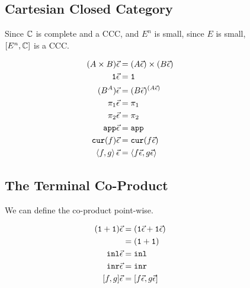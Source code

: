 \documentclass{Report}
\begin{document}
\begin{figure}
    \label{HowToBuildCCC}
    \begin{framed}
        \subsection{Cartesian Closed Category}
Since $\C$ is complete  and a CCC, and $E^n$ is small, since $E$ is small, $[E^n, \C]$ is a CCC.

\begin{align}
    (A\times B)\ev & = (A\ev)\times(B\ev)\\
    \1\ev & = \1\\
    (B^A)\ev &= (B\ev)^{(A\ev)}\\
    \p\ev & = \p\\
    \pp\ev & = \pp\\
    \app\ev & = \app\\
    \cur{f}\ev & = \cur{f\ev}\\
    \pr{f}{g}\ev & = \pr{f\ev}{g\ev}\\
\end{align}

\end{framed}
\end{figure}

\begin{figure}
    \label{HowToBuildCoproduct}
\begin{framed}
    \subsection{The Terminal Co-Product}

We can define the co-product point-wise.

\begin{align}
    (\1 + \1)\ev & = (\1\ev + \1\ev)\\
    & = (\1 + \1)\\
    \inl\ev &= \inl\\
    \inr\ev &= \inr\\
    [f, g]\ev &= [f\ev, g\ev]\\
\end{align}
\end{framed}
\end{figure}
\end{document}
